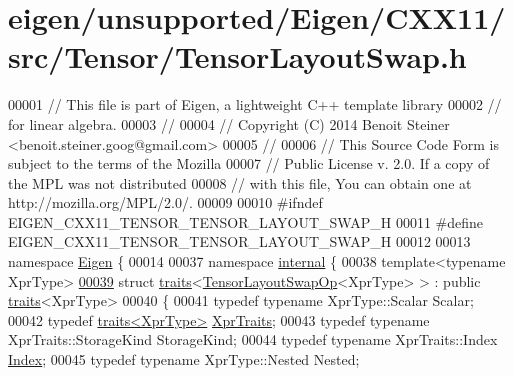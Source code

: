 \hypertarget{eigen_2unsupported_2_eigen_2_c_x_x11_2src_2_tensor_2_tensor_layout_swap_8h_source}{}\section{eigen/unsupported/\+Eigen/\+C\+X\+X11/src/\+Tensor/\+Tensor\+Layout\+Swap.h}
\label{eigen_2unsupported_2_eigen_2_c_x_x11_2src_2_tensor_2_tensor_layout_swap_8h_source}

\begin{DoxyCode}
00001 \textcolor{comment}{// This file is part of Eigen, a lightweight C++ template library}
00002 \textcolor{comment}{// for linear algebra.}
00003 \textcolor{comment}{//}
00004 \textcolor{comment}{// Copyright (C) 2014 Benoit Steiner <benoit.steiner.goog@gmail.com>}
00005 \textcolor{comment}{//}
00006 \textcolor{comment}{// This Source Code Form is subject to the terms of the Mozilla}
00007 \textcolor{comment}{// Public License v. 2.0. If a copy of the MPL was not distributed}
00008 \textcolor{comment}{// with this file, You can obtain one at http://mozilla.org/MPL/2.0/.}
00009 
00010 \textcolor{preprocessor}{#ifndef EIGEN\_CXX11\_TENSOR\_TENSOR\_LAYOUT\_SWAP\_H}
00011 \textcolor{preprocessor}{#define EIGEN\_CXX11\_TENSOR\_TENSOR\_LAYOUT\_SWAP\_H}
00012 
00013 \textcolor{keyword}{namespace }\hyperlink{namespace_eigen}{Eigen} \{
00014 
00037 \textcolor{keyword}{namespace }\hyperlink{namespaceinternal}{internal} \{
00038 \textcolor{keyword}{template}<\textcolor{keyword}{typename} XprType>
\hyperlink{struct_eigen_1_1internal_1_1traits_3_01_tensor_layout_swap_op_3_01_xpr_type_01_4_01_4}{00039} \textcolor{keyword}{struct }\hyperlink{struct_eigen_1_1internal_1_1traits}{traits}<\hyperlink{class_eigen_1_1_tensor_layout_swap_op}{TensorLayoutSwapOp}<XprType> > : \textcolor{keyword}{public} 
      \hyperlink{struct_eigen_1_1internal_1_1traits}{traits}<XprType>
00040 \{
00041   \textcolor{keyword}{typedef} \textcolor{keyword}{typename} XprType::Scalar Scalar;
00042   \textcolor{keyword}{typedef} \hyperlink{struct_eigen_1_1internal_1_1traits}{traits<XprType>} \hyperlink{struct_eigen_1_1internal_1_1traits}{XprTraits};
00043   \textcolor{keyword}{typedef} \textcolor{keyword}{typename} XprTraits::StorageKind StorageKind;
00044   \textcolor{keyword}{typedef} \textcolor{keyword}{typename} XprTraits::Index \hyperlink{namespace_eigen_a62e77e0933482dafde8fe197d9a2cfde}{Index};
00045   \textcolor{keyword}{typedef} \textcolor{keyword}{typename} XprType::Nested Nested;

\end{DoxyCode}
